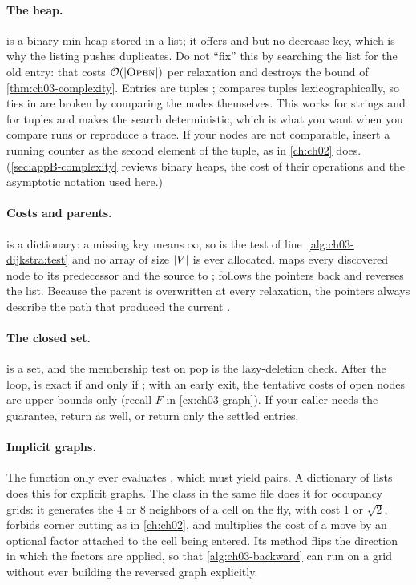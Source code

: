 \paragraph{The heap.}  is a binary min-heap stored in a
list; it offers  and  but no decrease-key, which is why the listing
pushes duplicates. Do not ``fix'' this by searching the list for the old entry: that costs
$\mathcal{O}\!\left(\left\lvert \text{\textsc{Open}} \right\rvert\right)$ per relaxation and destroys the bound of \cref{thm:ch03-complexity}.
Entries are tuples ; \python compares tuples lexicographically, so ties in
 are broken by comparing the nodes themselves. This works for strings and for
 tuples and makes the search deterministic, which is what you want when you
compare runs or reproduce a trace. If your nodes are not comparable, insert a running counter as
the second element of the tuple, as  in \cref{ch:ch02} does.
(\cref{sec:appB-complexity} reviews binary heaps, the cost of their operations
and the asymptotic notation used here.)

\paragraph{Costs and parents.}  is a dictionary: a missing key means $\infty$, so
 is the test of line~\ref{alg:ch03-dijkstra:test} and no array of size
$\left\lvert V \right\rvert$ is ever allocated.  maps every discovered node to its predecessor and the
source to ;  follows the pointers back and reverses the list.
Because the parent is overwritten at every relaxation, the pointers always describe the path
that produced the current .

\paragraph{The closed set.}  is a set, and the membership test on pop is the
lazy-deletion check. After the loop,  is exact if and only if ;
with an early exit, the tentative costs of open nodes are upper bounds only (recall $F$ in
\cref{ex:ch03-graph}). If your caller needs the guarantee, return  as well, or
return only the settled entries.

\paragraph{Implicit graphs.} The function only ever evaluates , which must yield
 pairs. A dictionary of lists does this for explicit graphs. The class
 in the same file does it for occupancy grids: it generates the 4 or 8
neighbors of a cell on the fly, with cost 1 or $\sqrt2$, forbids corner cutting as in
\cref{ch:ch02}, and multiplies the cost of a move by an optional factor attached to the cell
being entered. Its method  flips the direction in which the factors are
applied, so that \cref{alg:ch03-backward} can run on a grid without ever building the reversed
graph explicitly.


